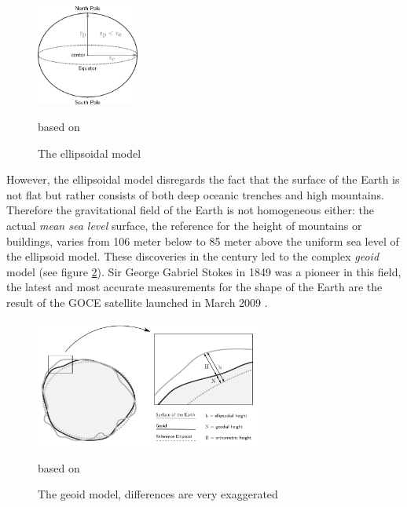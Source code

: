 \begin{figure}[ht]
  \centering
  \includegraphics[width = 0.3\textwidth]{graphics/basics/ellipsoid}
  \caption{The ellipsoidal model}
  \small{based on \cite[Fig. 3-3, p. 72]{bolstad2008gis}}
  \label{fig:ellipsoid}
\end{figure}

However, the ellipsoidal model disregards the fact that the surface of the Earth is not flat but rather consists of both deep oceanic trenches and high mountains. Therefore the gravitational field of the Earth is not homogeneous either: the actual \emph{mean sea level} surface, the reference for the height of mountains or buildings, varies from 106 meter below to 85 meter above the uniform sea level of the ellipsoid model. These discoveries in the  century led to the complex \emph{geoid} model (see figure \ref{fig:geoid}). Sir George Gabriel Stokes in 1849 was a pioneer in this field, the latest and most accurate measurements for the shape of the Earth are the result of the GOCE satellite launched in March 2009
\cite{geoid, geoidESRI}.


\begin{figure}[ht]
  \centering
  \includegraphics[width=0.66\textwidth]{graphics/basics/geoid}
  \caption{The geoid model, differences are very exaggerated}
  \small{based on \cite[Fig. 3-6, p. 75]{bolstad2008gis}}
  \label{fig:geoid}
\end{figure}


